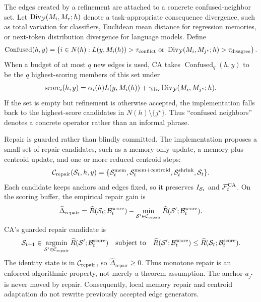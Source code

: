 The edges created by a refinement are attached to a concrete confused-neighbor set. Let $\operatorname{Div}_{\mathcal{Y}}(M_i,M_r;h)$ denote a task-appropriate consequence divergence, such as total variation for classifiers, Euclidean mean distance for regression memories, or next-token distribution divergence for language models. Define
\begin{align*}
\operatorname{Confused}(h,y)
=
\left\{
i\in N(h):
L(y,M_i(h))>\tau_{\mathrm{conflict}}
\ \text{or}\
\operatorname{Div}_{\mathcal{Y}}(M_i,M_{j^\star};h)>\tau_{\mathrm{disagree}}
\right\}.
\end{align*}
When a budget of at most $q$ new edges is used, CA takes $\operatorname{Confused}_q(h,y)$ to be the $q$ highest-scoring members of this set under
\begin{align*}
\operatorname{score}_i(h,y)
=
\alpha_i(h)L(y,M_i(h))
+\gamma_{\mathrm{div}}\operatorname{Div}_{\mathcal{Y}}(M_i,M_{j^\star};h).
\end{align*}
If the set is empty but refinement is otherwise accepted, the implementation falls back to the highest-score candidates in $N(h)\setminus\{j^\star\}$. Thus ``confused neighbors'' denotes a concrete operator rather than an informal phrase.

Repair is guarded rather than blindly committed. The implementation proposes a small set of repair candidates, such as a memory-only update, a memory-plus-centroid update, and one or more reduced centroid steps:
\begin{align*}
\mathcal{C}_{\mathrm{repair}}(\mathcal{S}_t,h,y)
=
\{\mathcal{S}_t^{\mathrm{mem}},\mathcal{S}_t^{\mathrm{mem+centroid}},\mathcal{S}_t^{\mathrm{shrink}},\mathcal{S}_t\}.
\end{align*}
Each candidate keeps anchors and edges fixed, so it preserves $I_{\mathcal{S}_t}$ and $\mathcal{F}_t^{\mathrm{CA}}$. On the scoring buffer, the empirical repair gain is
\begin{align*}
\widehat\Delta_{\mathrm{repair}}
=
\widehat R(\mathcal{S}_t;\mathcal{B}_t^{\mathrm{score}})
-
\min_{\mathcal{S}'\in\mathcal{C}_{\mathrm{repair}}}
\widehat R(\mathcal{S}';\mathcal{B}_t^{\mathrm{score}}).
\end{align*}
CA's guarded repair candidate is
\begin{align}
\mathcal{S}_{t+1}\in
\operatorname*{argmin}_{\mathcal{S}'\in\mathcal{C}_{\mathrm{repair}}}
\widehat R(\mathcal{S}';\mathcal{B}_t^{\mathrm{score}})
\quad\text{subject to}\quad
\widehat R(\mathcal{S}';\mathcal{B}_t^{\mathrm{score}})
\le
\widehat R(\mathcal{S}_t;\mathcal{B}_t^{\mathrm{score}}).
\label{eq:guarded-repair}
\end{align}
The identity state is in $\mathcal{C}_{\mathrm{repair}}$, so $\widehat\Delta_{\mathrm{repair}}\ge0$. Thus monotone repair is an enforced algorithmic property, not merely a theorem assumption. The anchor $a_{j^\star}$ is never moved by repair. Consequently, local memory repair and centroid adaptation do not rewrite previously accepted edge generators.


